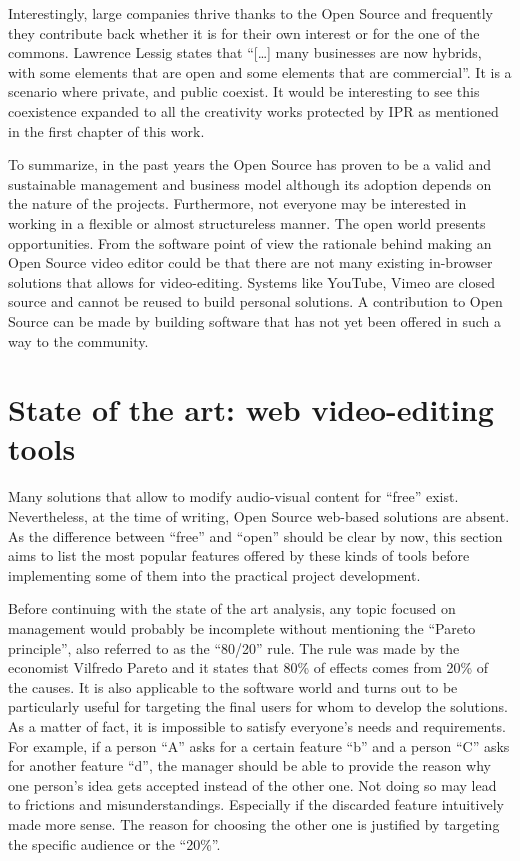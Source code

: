 Interestingly, large companies thrive thanks to the Open Source and frequently they contribute back whether it is for their own interest or for the one of the commons. Lawrence Lessig states that “[…] many businesses are now hybrids, with some elements that are open and some elements that are commercial”. It is a scenario where private, and public coexist. It would be interesting to see this coexistence expanded to all the creativity works protected by IPR as mentioned in the first chapter of this work.

To summarize, in the past years the Open Source has proven to be a valid and sustainable management and business model although its adoption depends on the nature of the projects. Furthermore, not everyone may be interested in working in a flexible or almost structureless manner.
The open world presents opportunities. From the software point of view the rationale behind making an Open Source video editor could be that there are not many existing in-browser solutions that allows for video-editing. Systems like YouTube, Vimeo are closed source and cannot be reused to build personal solutions. A contribution to Open Source can be made by building software that has not yet been offered in such a way to the community.

\section{State of the art: web video-editing tools}
\label{sec:stateOfArt}

Many solutions that allow to modify audio-visual content for “free” exist. Nevertheless, at the time of writing, Open Source web-based solutions are absent. As the difference between “free” and “open” should be clear by now, this section aims to list the most popular features offered by these kinds of tools before implementing some of them into the practical project development.

Before continuing with the state of the art analysis, any topic focused on management would probably be incomplete without mentioning the “Pareto principle”, also referred to as the “80/20” rule. The rule was made by the economist Vilfredo Pareto and it states that 80\% of effects comes from 20\% of the causes. It is also applicable to the software world and turns out to be particularly useful for targeting the final users for whom to develop the solutions. As a matter of fact, it is impossible to satisfy everyone’s needs and requirements. For example, if a person “A” asks for a certain feature “b” and a person “C” asks for another feature “d”, the manager should be able to provide the reason why one person’s idea gets accepted instead of the other one. Not doing so may lead to frictions and misunderstandings. Especially if the discarded feature intuitively made more sense. The reason for choosing the other one is justified by targeting the specific audience or the “20\%”.

